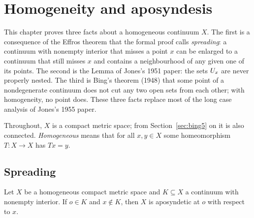 \chapter{Homogeneity and aposyndesis}\label{ch:spread}

This chapter proves three facts about a homogeneous continuum $X$. The first is a consequence of the
Effros theorem that the formal proof calls \emph{spreading}: a continuum with nonempty interior that
misses a point $x$ can be enlarged to a continuum that still misses $x$ and contains a neighbourhood of
any given one of its points. The second is the Lemma of Jones's 1951 paper: the sets $U_{x}$ are never
properly nested. The third is Bing's theorem (1948) that some point of a nondegenerate continuum does
not cut any two open sets from each other; with homogeneity, no point does. These three facts replace
most of the long case analysis of Jones's 1955 paper.

Throughout, $X$ is a compact metric space; from Section~\ref{sec:bing5} on it is also connected.
\emph{Homogeneous} means that for all $x,y\in X$ some homeomorphism $T\colon X\to X$ has $Tx=y$.


\section{Spreading}

\begin{theorem}[Spreading]\label{thm:spreading}
Let $X$ be a homogeneous compact metric space and $K\subseteq X$ a continuum with nonempty interior. If
$o\in K$ and $x\notin K$, then $X$ is aposyndetic at $o$ with respect to $x$.
\end{theorem}

